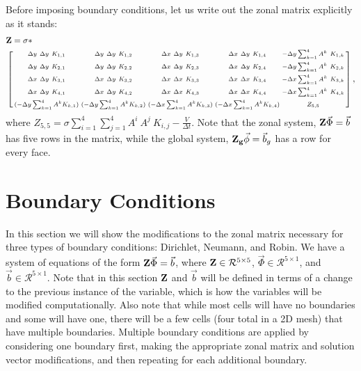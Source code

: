 \documentclass[11pt,letterpaper,oneside,notitlepage]{article}	%
\newcommand{\pindent}[1]{\hspace{6mm}}  		%
\numberwithin{equation}{section}				%
\begin{document}
Before imposing boundary conditions, let us write out the zonal matrix explicitly as it stands:
\begin{align}&{\bf Z}=\sigma* \\\notag
&\left[\begin{smallmatrix}
\Delta y\ \Delta y\ K_{1,1} & \Delta y\ \Delta y\ K_{1,2} & \Delta x\ \Delta y\ K_{1,3} &\Delta x\ \Delta y\ K_{1,4} & -\Delta y\sum_{k=1}^4 A^k\ K_{1,k}
\\ \noalign{\:}
\Delta y\ \Delta y\ K_{2,1} & \Delta y\ \Delta y\ K_{2,2} & \Delta x\ \Delta y\ K_{2,3} &\Delta x\ \Delta y\ K_{2,4} & -\Delta y\sum_{k=1}^4 A^k\ K_{2,k}
\\ \noalign{\:}
\Delta x\ \Delta y\ K_{3,1} & \Delta x\ \Delta y\ K_{3,2} & \Delta x\ \Delta x\ K_{3,3} &\Delta x\ \Delta x\ K_{3,4} & -\Delta x\sum_{k=1}^4 A^k\ K_{3,k}
\\ \noalign{\:}
\Delta x\ \Delta y\ K_{4,1} & \Delta x\ \Delta y\ K_{4,2} & \Delta x\ \Delta x\ K_{4,3} &\Delta x\ \Delta x\ K_{4,4} & -\Delta x\sum_{k=1}^4 A^k\ K_{4,k}
\\ \noalign{\:}
(-\Delta y\sum_{k=1}^4 A^k K_{k,1}) & (-\Delta y\sum_{k=1}^4 A^k K_{k,2}) & (-\Delta x\sum_{k=1}^4 A^k K_{k,3}) & (-\Delta x\sum_{k=1}^4 A^k K_{k,4}) & Z_{5,5}
\end{smallmatrix}\right],\end{align}
where $Z_{5,5}=\sigma\sum_{i=1}^4\sum_{j=1}^4 A^i\ A^j\ K_{i,j}-\frac{V}{\Delta t}$. Note that the zonal system, ${\bf Z}\vec\Phi=\vec b$ has five rows in the matrix, while the global system, ${\bf Z_g}\vec\phi=\vec b_g$ has a row for every face.

\section{Boundary Conditions}%
\pindent{}In this section we will show the modifications to the zonal matrix necessary for three types of boundary conditions: Dirichlet, Neumann, and Robin.  We have a system of equations of the form ${\bf Z}\vec\Phi=\vec b$, where ${\bf Z}\in\mathcal R^{5\times5}$, $\vec\Phi\in\mathcal R^{5\times1}$, and $\vec b\in\mathcal R^{5\times1}$. Note that in this section $\bf Z$ and $\vec b$ will be defined in terms of a change to the previous instance of the variable, which is how the variables will be modified computationally. Also note that while most cells will have no boundaries and some will have one, there will be a few cells (four total in a 2D mesh) that have multiple boundaries.  Multiple boundary conditions are applied by considering one boundary first, making the appropriate zonal matrix and solution vector modifications, and then repeating for each additional boundary.
\end{document}
